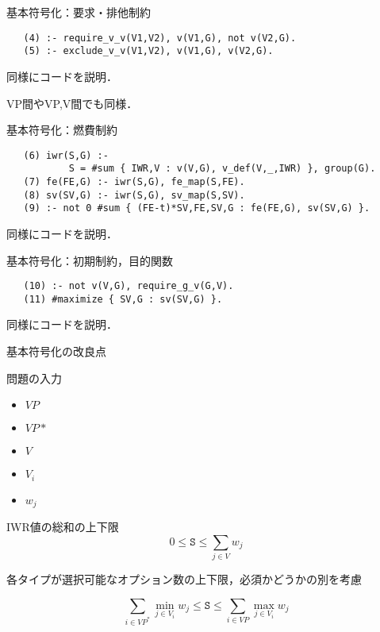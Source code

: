 \documentclass[dvipdfmx, 11pt]{beamer}
\begin{document}
\begin{frame}[fragile]{基本符号化：要求・排他制約}
 \begin{exampleblock}{}
  \begin{lstlisting}
   (4) :- require_v_v(V1,V2), v(V1,G), not v(V2,G).
   (5) :- exclude_v_v(V1,V2), v(V1,G), v(V2,G).
  \end{lstlisting}
 \end{exampleblock}

 同様にコードを説明．

 VP間やVP,V間でも同様．
\end{frame}
\begin{frame}[fragile]{基本符号化：燃費制約}
 \begin{exampleblock}{}
  \small
  \begin{lstlisting}
   (6) iwr(S,G) :- 
           S = #sum { IWR,V : v(V,G), v_def(V,_,IWR) }, group(G).
   (7) fe(FE,G) :- iwr(S,G), fe_map(S,FE).
   (8) sv(SV,G) :- iwr(S,G), sv_map(S,SV).
   (9) :- not 0 #sum { (FE-t)*SV,FE,SV,G : fe(FE,G), sv(SV,G) }.
  \end{lstlisting}
 \end{exampleblock}
 同様にコードを説明．
\end{frame}
\begin{frame}[fragile]{基本符号化：初期制約，目的関数}
 \begin{exampleblock}{}
  \begin{lstlisting}
   (10) :- not v(V,G), require_g_v(G,V).
   (11) #maximize { SV,G : sv(SV,G) }.
  \end{lstlisting}
 \end{exampleblock}
 同様にコードを説明．
\end{frame}
\begin{frame}{基本符号化の改良点}
 \begin{block}{問題の入力}
  \begin{itemize}
   \item $VP$ 
   \item $VP*$
   \item $V$
   \item $V_i$
   \item $w_j$
  \end{itemize}
 \end{block}
 \begin{block}{IWR値の総和の上下限}
  \[
   0 \leq \texttt{S} \leq \sum_{j\in V}w_{j}
  \]
 \end{block}
 \alert{各タイプが選択可能なオプション数の上下限，必須かどうかの別を考慮}
 \begin{alertblock}{}
  \[
   \sum_{i\in VP^{*}}\min_{j\in V_{i}}w_{j}
   \leq \texttt{S} \leq
   \sum_{i\in VP}\max_{j\in V_{i}}w_{j}
  \]
 \end{alertblock}
\end{frame}
\end{document}
